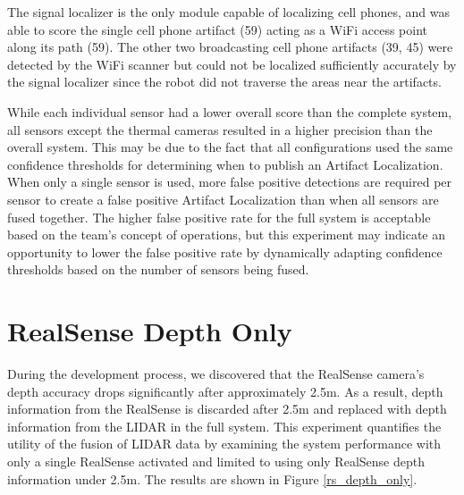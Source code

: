 The signal localizer is the only module capable of localizing cell phones, and was able to score the single cell phone artifact (59) acting as a WiFi access point along its path (59). The other two broadcasting cell phone artifacts (39, 45) were detected by the WiFi scanner but could not be localized sufficiently accurately by the signal localizer since the robot did not traverse the areas near the artifacts.

While each individual sensor had a lower overall score than the complete system, all sensors except the thermal cameras resulted in a higher precision than the overall system. This may be due to the fact that all configurations used the same confidence thresholds for determining when to publish an Artifact Localization. When only a single sensor is used, more false positive detections are required per sensor to create a false positive Artifact Localization than when all sensors are fused together. The higher false positive rate for the full system is acceptable based on the team's concept of operations, but this experiment may indicate an opportunity to lower the false positive rate by dynamically adapting confidence thresholds based on the number of sensors being fused.

\section{RealSense Depth Only}

During the development process, we discovered that the RealSense camera's depth accuracy drops significantly after approximately 2.5m. As a result, depth information from the RealSense is discarded after 2.5m and replaced with depth information from the LIDAR in the full system. This experiment quantifies the utility of the fusion of LIDAR data by examining the system performance with only a single RealSense activated and limited to using only RealSense depth information under 2.5m. The results are shown in Figure \ref{rs_depth_only}.

